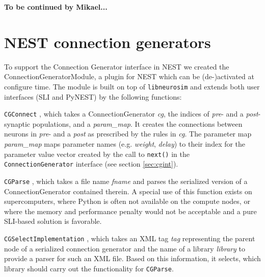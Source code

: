 \documentclass{frontiersSCNS} %
\newcommand{\tbw}[1]{{\bf\parindent0pt\color{red}#1}}
\begin{document}
\tbw{To be continued by Mikael...}

\section{NEST connection generators}\label{sec:conn_gen_nest}

%

To support the Connection Generator interface in NEST
we created the ConnectionGeneratorModule, a plugin for NEST which can
be (de-)activated at configure time. The module is built on top of
\verb|libneurosim| and extends both user interfaces (SLI and PyNEST)
by the following functions:

\begin{unlist}
\item[\tt CGConnect], which takes a ConnectionGenerator \emph{cg}, the
  indices of \emph{pre}- and a \emph{post}-synaptic populations, and a
  \emph{param\_map}. It creates the connections between neurons in
  \emph{pre}- and a \emph{post} as prescribed by the rules in
  \emph{cg}. The parameter map \emph{param\_map} maps parameter names
  (e.g. \emph{weight}, \emph{delay}) to their index for the parameter
  value vector created by the call to \verb|next()| in the
  \verb|ConnectionGenerator| interface (see section \ref{sec:cgint}).
\item[\tt CGParse], which takes a file name \emph{fname} and parses
  the serialized version of a ConnectionGenerator contained therein. A
  special use of this function exists on supercomputers, where Python
  is often not available on the compute nodes, or where the memory and
  performance penalty would not be acceptable and a pure SLI-based
  solution is favorable.
\item[\tt CGSelectImplementation], which takes an XML tag \emph{tag}
  representing the parent node of a serialized connection generator
  and the name of a library \emph{library} to provide a parser for
  such an XML file. Based on this information, it selects, which
  library should carry out the functionality for \verb|CGParse|.
\end{unlist}
\end{document}

